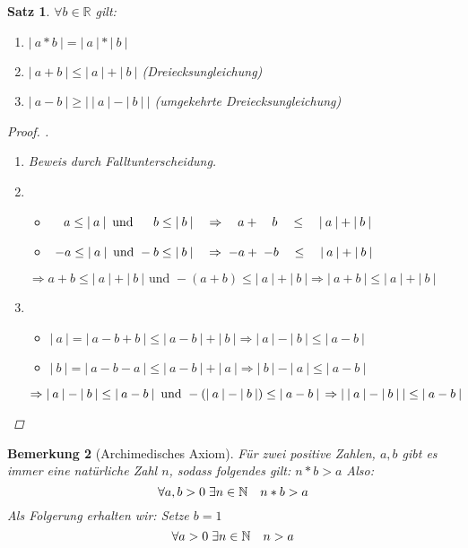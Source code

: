 \documentclass[a4paper,titlepage,oneside]{article}
\def\N{\ensuremath{\mathbb{N}} }
\def\R{\ensuremath{\mathbb{R}} }
\def\fa{\ensuremath{\forall}}
\def\ex{\ensuremath{\exists}}
\def\sp{\hspace{0,1cm}}
\newcommand{\abs}[1]{\ensuremath{\left|\:#1\:\right|}}
\theoremstyle{thmstyle}
\newtheorem{satz}{Satz}[subsection]
\newtheorem{bem}[satz]{Bemerkung}
\begin{document}
\begin{satz}
\(\fa b \in \R\) gilt:
\begin{enumerate}[label=(\arabic*)]
\item \(\abs{a * b} = \abs{a} * \abs{b}\)
\item \(\abs{a + b} \le \abs{a} + \abs{b}\) (Dreiecksungleichung)
\item \(\abs{a - b} \ge \abs{\abs{a} - \abs{b}}\) (umgekehrte Dreiecksungleichung)
\end{enumerate}
\begin{proof}.
\begin{enumerate}[label=(\arabic*)]
\item Beweis durch Falltunterscheidung.
\item 
\begin{itemize}
\item \(\quad a \le \abs{a} \text{ und } \sp \quad b \le \abs{b} \quad \Rightarrow \quad a + \quad b \quad\le\quad \abs{a}+\abs{b} \) 
\item \(\sp-a \le \abs{a} \text{ und } -b \le \abs{b} \quad \Rightarrow \sp -a + \sp -b \quad\le\quad \abs{a} +\abs{b} \)
\end{itemize}
\(\Rightarrow a + b \le \abs{a} + \abs{b} \text{ und } -(a + b) \le \abs{a} + \abs{b} \Rightarrow \abs{a + b} \le \abs{a} + \abs{b} \)
\item
\begin{itemize}
\item \(\abs{a} = \abs{a - b + b} \le \abs{a - b} + \abs{b} \Rightarrow \abs{a} - \abs{b} \le \abs{a-b}\)
\item \(\abs{b} = \abs{a - b - a} \le \abs{a - b} + \abs{a} \Rightarrow \abs{b} - \abs{a} \le \abs{a-b}\)
\end{itemize}
\(\Rightarrow \abs{a} - \abs{b} \le \abs{a-b} \text{ und } - (\abs{a} - \abs{b}) \le \abs{a-b} \\
\Rightarrow \abs{\abs{a} - \abs{b}} \le \abs{a-b}\)
\end{enumerate}
\end{proof}
\end{satz}

\begin{bem}[Archimedisches Axiom]
Für zwei positive Zahlen, \(a, b\) gibt es immer eine natürliche Zahl $n$, sodass folgendes gilt: \(n * b > a\) Also:
\[\fa a,b > 0 \sp \ex n \in \N \quad n * b > a\]
Als Folgerung erhalten wir: Setze \(b = 1\)
\[\fa a > 0 \sp \ex n \in \N \quad n > a\]
\end{bem}
\end{document}
